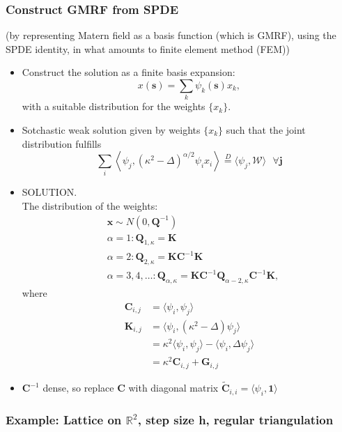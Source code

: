 \documentclass{article}
\begin{document}
\subsubsection*{Construct GMRF from SPDE}
(by representing Matern field as a basis function (which is GMRF), using the SPDE identity, in what amounts to finite element method (FEM))
      \begin{itemize}
      \item Construct the solution as a finite basis expansion:
      $$ x(\pmb{s}) = \sum_{k} \psi_{k}(\pmb{s})x_{k},$$
      with a suitable distribution for the weights $\{x_{k}\}$.
      \item Sotchastic weak solution given by weights $\{x_{k}\}$ such that the joint distribution fulfills
      $$ \sum_{i} \left< \psi_{j}, (\kappa^{2} - \Delta)^{\alpha/2} \psi_{i} x_{i} \right> \overset{D}{=} \langle \psi_{j}, \mathcal{W} \rangle \text{  } \forall \pmb{j}$$
      \item SOLUTION. \\The distribution of the weights:
      \begin{align}
      & \pmb{x} \sim N(0, \pmb{Q}^{-1}) \\
      & \alpha = 1: \pmb{Q}_{1,\kappa} = \pmb{K} \\
      & \alpha = 2: \pmb{Q}_{2,\kappa} = \pmb{K} \pmb{C}^{-1} \pmb{K}  \\
      & \alpha = 3, 4, \hdots : \pmb{Q}_{\alpha,\kappa} = \pmb{K} \pmb{C}^{-1} \pmb{Q}_{\alpha - 2,\kappa} \pmb{C}^{-1} \pmb{K},
      \end{align}
      where
      \begin{align}
      \pmb{C}_{i,j} & = \langle \psi_{i}, \psi_{j} \rangle \\
      \pmb{K}_{i,j} & = \langle \psi_{i}, (\kappa^{2} - \Delta)\psi_{j} \rangle \\
      & = \kappa^{2} \langle \psi_{i}, \psi_{j} \rangle - \langle \psi_{i}, \Delta \psi_{j} \rangle \\
      & = \kappa^{2} \pmb{C}_{i,j} + \pmb{G}_{i,j}
      \end{align}
      \item $\pmb{C}^{-1}$ dense, so replace $\pmb{C}$ with diagonal matrix $\widetilde{\pmb{C}}_{i,i} = \langle \psi_{i}, \pmb{1} \rangle$
      \end{itemize}
\subsubsection*{Example: Lattice on $\mathbb{R}^{2}$, step size h, regular triangulation}
\end{document}
